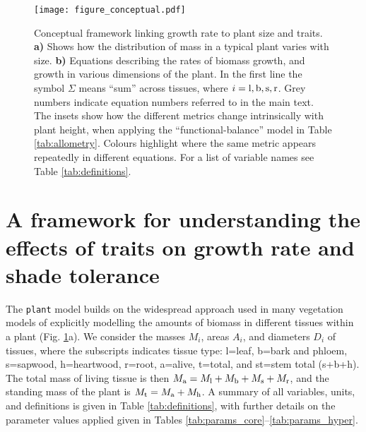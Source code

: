 \documentclass[9pt,twocolumn,twoside,lineno]{pnas-new}
\newcommand{\plant}{\texttt{plant}}
\begin{document}
\begin{figure}[!ht]
\centering
\texttt{[image: figure\_conceptual.pdf]}
\caption{Conceptual framework linking growth rate to plant size and traits.
\textbf{a)} Shows how the distribution of mass in a typical plant varies with size.
\textbf{b)} Equations describing the rates of biomass growth, and growth in various dimensions of the plant. In the first line the symbol $\Sigma$ means ``sum'' across tissues, where $i = {\rm l,b,s,r}$. Grey numbers indicate equation numbers referred to in the main text. The insets show how the different metrics change intrinsically with plant height, when applying the ``functional-balance'' model in Table \ref{tab:allometry}. Colours highlight where the same metric appears repeatedly in different equations. For a list of variable names see Table \ref{tab:definitions}.}
\label{fig:conceptual}
\end{figure}

\section*{A framework for understanding the effects of traits on growth rate and shade tolerance}

The {\plant} model builds on the widespread approach used in many vegetation models of explicitly modelling the amounts of biomass in different tissues within a plant \citep[e.g.][]{Givnish-1988, Makela-1997, Moorcroft-2001, Sitch-2008, Falster-2011, King-2011, DeKauwe-2014} (Fig. \ref{fig:conceptual}a). We consider the masses $M_i$, areas $A_i$, and diameters $D_i$ of tissues, where the subscripts indicates tissue type: l=leaf, b=bark and phloem, s=sapwood, h=heartwood, r=root, a=alive, t=total, and st=stem total (s+b+h). The total mass of living tissue is then $M_{\rm a}=M_{\rm l}+M_{\rm b}+M_{\rm s}+M_{\rm r}$, and the standing mass of the plant is $M_{\rm t}=M_{\rm a}+M_{\rm h}$. A summary of all variables, units, and definitions is given in Table \ref{tab:definitions}, with further details on the parameter values applied given in Tables \ref{tab:params_core}--\ref{tab:params_hyper}.
\end{document}
